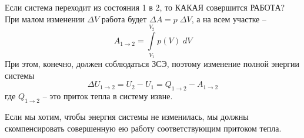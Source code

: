 \documentclass[12pt,epsfig,color,russian]{article}
\begin{document}
 Если система переходит из состояния 1 в 2, то КАКАЯ совершится РАБОТА? При малом изменении $\Delta V$ работа будет $\Delta A=p\;\Delta V$, а на всем участке --
 \begin{displaymath}
 A_{1\rightarrow2}=\int\limits_{V_1}^{V_2}p(V)\;dV
 \end{displaymath}
 При этом, конечно, должен соблюдаться ЗСЭ, поэтому изменение полной энергии системы
 \begin{displaymath}
 \Delta U_{1\rightarrow2} = U_2-U_1=Q_{1\rightarrow2}-A_{1\rightarrow2}
 \end{displaymath}
 где $Q_{1\rightarrow2}$ -- это приток тепла в систему извне.

 Если мы хотим, чтобы энергия системы не изменилась, мы должны скомпенсировать совершенную ею работу соответствующим притоком тепла.\\
\end{document}
